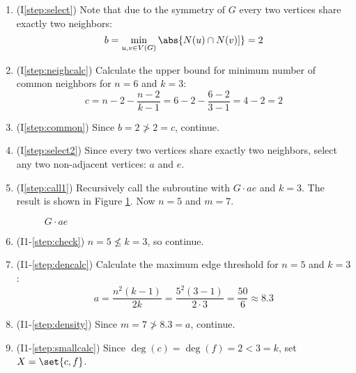 \begin{enumerate}
\item (I\ref{step:select}) Note that due to the symmetry of \(G\) every two vertices share exactly two neighbors:
  \[b=\min_{u,v\in V(G)}\abs{N(u)\cap N(v)]}=2\]

\item (I\ref{step:neighcalc}) Calculate the upper bound for minimum number of common neighbors for \(n=6\) and
  \(k=3\):
  \[c=n-2-\frac{n-2}{k-1}=6-2-\frac{6-2}{3-1}=4-2=2\]

\item (I\ref{step:common}) Since \(b=2\ngtr2=c\), continue.

\item (I\ref{step:select2}) Since every two vertices share exactly two neighbors, select any two non-adjacent
  vertices: \(a\) and \(e\).

\item (I\ref{step:call1}) Recursively call the subroutine with \(G\cdot ae\) and \(k=3\).  The result is shown in
  Figure \ref{fig:conae}.  Now \(n=5\) and \(m=7\).

  \begin{figure}[h]
    \label{fig:conae}
    \begin{center}
    \end{center}
    \caption{\(G\cdot ae\)}
  \end{figure}

\item (I1-\ref{step:check}) \(n=5\nleq k=3\), so continue.

\item (I1-\ref{step:dencalc}) Calculate the maximum edge threshold for \(n=5\) and \(k=3\):
  \[a=\frac{n^2(k-1)}{2k}=\frac{5^2(3-1)}{2\cdot3}=\frac{50}{6}\approx8.3\]

\item (I1-\ref{step:density}) Since \(m=7\ngtr8.3=a\), continue.

\item (I1-\ref{step:smallcalc}) Since \(\deg(c)=\deg(f)=2<3=k\), set \(X=\set{c,f}\).


\end{enumerate}
